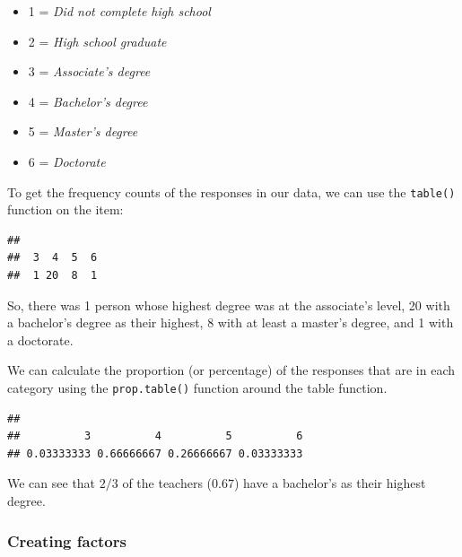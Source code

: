 \documentclass[
]{article}
\newenvironment{Shaded}{\begin{snugshade}}{\end{snugshade}}
\newcommand{\KeywordTok}[1]{\textcolor[rgb]{0.13,0.29,0.53}{\textbf{#1}}}
\newcommand{\NormalTok}[1]{#1}
\newcommand{\OperatorTok}[1]{\textcolor[rgb]{0.81,0.36,0.00}{\textbf{#1}}}
\providecommand{\tightlist}{%
  \setlength{\itemsep}{0pt}\setlength{\parskip}{0pt}}
\begin{document}
\begin{itemize}
\tightlist
\item
  1 = \emph{Did not complete high school}
\item
  2 = \emph{High school graduate}
\item
  3 = \emph{Associate's degree}
\item
  4 = \emph{Bachelor's degree}
\item
  5 = \emph{Master's degree}
\item
  6 = \emph{Doctorate}
\end{itemize}

To get the frequency counts of the responses in our data, we can use the \texttt{table()} function on the item:

\begin{Shaded}
\end{Shaded}

\begin{verbatim}
## 
##  3  4  5  6 
##  1 20  8  1
\end{verbatim}

So, there was 1 person whose highest degree was at the associate's level, 20 with a bachelor's degree as their highest, 8 with at least a master's degree, and 1 with a doctorate.

We can calculate the proportion (or percentage) of the responses that are in each category using the \texttt{prop.table()} function around the table function.

\begin{Shaded}
\end{Shaded}

\begin{verbatim}
## 
##          3          4          5          6 
## 0.03333333 0.66666667 0.26666667 0.03333333
\end{verbatim}

We can see that \(2/3\) of the teachers (\(0.67\)) have a bachelor's as their highest degree.

\hypertarget{creating-factors}{%
\subsubsection{Creating factors}\label{creating-factors}}
\end{document}
